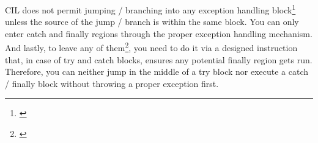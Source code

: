 CIL does not permit jumping / branching into any exception handling block\footnote{\citep[Sec. I.12.4.2.8.2.7]{CLIEcma}} unless the source of the jump / branch is within the same block. You can only enter catch and finally regions through the proper exception handling mechanism. And lastly, to leave any of them\footnote{\citep[Sec. I.12.4.2.8.2.8]{CLIEcma}}, you need to do it via a designed instruction that, in case of try and catch blocks, ensures any potential finally region gets run. Therefore, you can neither jump in the middle of a try block nor execute a catch / finally block without throwing a proper exception first.

